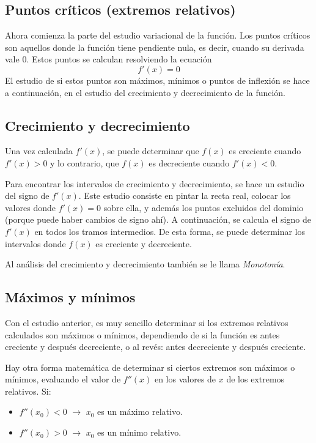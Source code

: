 \documentclass[sans]{apuntes}
\begin{document}
\subsection{Puntos críticos (extremos relativos)}
Ahora comienza la parte del estudio variacional de la función. Los puntos críticos son aquellos donde la función tiene pendiente nula, es decir, cuando su derivada vale 0. Estos puntos se calculan resolviendo la ecuación
\[f'(x) = 0\]
El estudio de si estos puntos son máximos, mínimos o puntos de inflexión se hace a continuación, en el estudio del crecimiento y decrecimiento de la función.

\subsection{Crecimiento y decrecimiento}
Una vez calculada $f'(x)$, se puede determinar que $f(x)$ es creciente cuando $f'(x) > 0$ y lo contrario, que $f(x)$ es decreciente cuando $f'(x) < 0$.
\par Para encontrar los intervalos de crecimiento y decrecimiento, se hace un estudio del signo de $f'(x)$. Este estudio consiste en pintar la recta real, colocar los valores donde $f'(x) = 0$ sobre ella, y además los puntos excluidos del dominio (porque puede haber cambios de signo ahí). A continuación, se calcula el signo de $f'(x)$ en todos los tramos intermedios. De esta forma, se puede determinar los intervalos donde $f(x)$ es creciente y decreciente.
\par Al análisis del crecimiento y decrecimiento también se le llama \emph{Monotonía}.

\subsection{Máximos y mínimos}
Con el estudio anterior, es muy sencillo determinar si los extremos relativos calculados son máximos o mínimos, dependiendo de si la función es antes creciente y después decreciente, o al revés: antes decreciente y después creciente.
\par Hay otra forma matemática de determinar si ciertos extremos son máximos o mínimos, evaluando el valor de $f''(x)$ en los valores de $x$ de los extremos relativos. Si:
\begin{itemize}
	\item $f''(x_0) < 0$ $\to$ $x_0$ es un máximo relativo.
	\item $f''(x_0) > 0$ $\to$ $x_0$ es un mínimo relativo.
\end{itemize}
\end{document}

